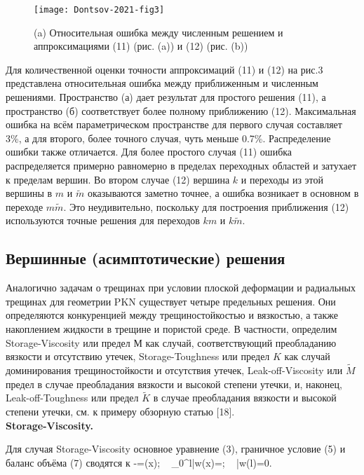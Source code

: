\documentclass[main.tex]{subfiles}
\begin{document}
\begin{figure}[H]
\center
\texttt{[image: Dontsov-2021-fig3]}
\vspace*{-10mm}
\caption{(a) Относительная ошибка между численным решением и аппроксимациями (11) (рис. (a)) и (12) (рис. (b))}
\label{fig:Dontsov-2021-fig3}
\end{figure}

Для количественной оценки точности аппроксимаций (11) и (12) на рис.3 представлена относительная ошибка между приближенным и численным решениями.
Пространство (а) дает результат для простого решения (11), а пространство (б) соответствует более полному приближению (12).
Максимальная ошибка на всём параметрическом пространстве для первого случая составляет 3\%, а для второго, более точного случая, чуть меньше 0.7\%.
Распределение ошибки также отличается.
Для более простого случая (11) ошибка распределяется примерно равномерно в пределах переходных областей и затухает к пределам вершин.
Во втором случае (12) вершина $k$ и переходы из этой вершины в $m$ и $\tilde{m}$ оказываются заметно точнее, а ошибка возникает в основном в переходе $m\tilde{m}$.
Это неудивительно, поскольку для построения приближения (12) используются точные решения для переходов $km$ и $k\tilde{m}$.

\subsection{Вершинные (асимптотические) решения}

Аналогично задачам о трещинах при условии плоской деформации и радиальных трещинах для геометрии PKN существует четыре предельных решения.
Они определяются конкуренцией между трещиностойкостью и вязкостью, а также накоплением жидкости в трещине и пористой среде.
В частности, определим Storage-Viscosity или предел $М$ как случай, соответствующий преобладанию вязкости и отсутствию утечек, Storage-Toughness или предел $K$ как случай доминирования трещиностойкости и отсутствия утечек, Leak-off-Viscosity или $\tilde{M}$ предел в случае преобладания вязкости и высокой степени утечки, и, наконец, Leak-off-Toughness или предел $\tilde{K}$ в случае преобладания вязкости и высокой степени утечки, см. к примеру обзорную статью [18].\\

\textbf{Storage-Viscosity.}

Для случая Storage-Viscosity основное уравнение (3), граничное условие (5) и баланс объёма (7) сводятся к
\beq
{}-=\delta(x);\,\,\,\,\,
\int\limits_{0}^{l}\bar{w}(x)=;\,\,\,\,\,
\bar{w}(l)=0.
\eeq
\end{document}
